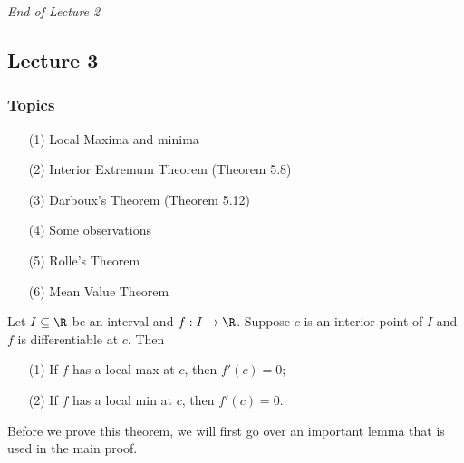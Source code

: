 \begin{center}
    \textit{End of Lecture 2} 
\end{center}


\subsection{Lecture 3}

\subsubsection{Topics}

\begin{enumerate}
    \item[(1)] Local Maxima and minima
    \item[(2)] Interior Extremum Theorem (Theorem 5.8)
    \item[(3)] Darboux's Theorem (Theorem 5.12)
    \item[(4)] Some observations
    \item[(5)] Rolle's Theorem
    \item[(6)] Mean Value Theorem
\end{enumerate}

\begin{theorem}\label{Theorem 5.8}
    Let \( I \subseteq  \R   \) be an interval and \( f : I \to \R  \). Suppose \( c  \) is an interior point of \( I  \) and \( f  \) is differentiable at \( c  \). Then
    \begin{enumerate}
        \item[(1)] If \( f  \) has a local max at \( c  \), then \( f'(c)  = 0 \);
        \item[(2)] If \( f  \) has a local min at \( c  \), then \( f'(c) = 0  \).
    \end{enumerate}
\end{theorem}

Before we prove this theorem, we will first go over an important lemma that is used in the main proof. 

